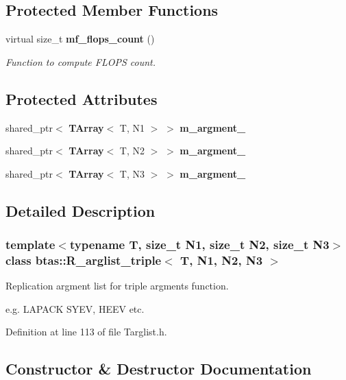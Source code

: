 \subsection*{Protected Member Functions}
\begin{DoxyCompactItemize}
\item 
virtual size\-\_\-t {\bf mf\-\_\-flops\-\_\-count} ()
\begin{DoxyCompactList}\small\item\em Function to compute F\-L\-O\-P\-S count. \end{DoxyCompactList}\end{DoxyCompactItemize}
\subsection*{Protected Attributes}
\begin{DoxyCompactItemize}
\item 
shared\-\_\-ptr$<$ {\bf T\-Array}$<$ T, N1 $>$ $>$ {\bf m\-\_\-argment\-\_}
\item 
shared\-\_\-ptr$<$ {\bf T\-Array}$<$ T, N2 $>$ $>$ {\bf m\-\_\-argment\-\_}
\item 
shared\-\_\-ptr$<$ {\bf T\-Array}$<$ T, N3 $>$ $>$ {\bf m\-\_\-argment\-\_}
\end{DoxyCompactItemize}


\subsection{Detailed Description}
\subsubsection*{template$<$typename T, size\-\_\-t N1, size\-\_\-t N2, size\-\_\-t N3$>$class btas\-::\-R\-\_\-arglist\-\_\-triple$<$ T, N1, N2, N3 $>$}

Replication argment list for triple argments function. 

e.\-g. L\-A\-P\-A\-C\-K S\-Y\-E\-V, H\-E\-E\-V etc. 

Definition at line 113 of file Targlist.\-h.



\subsection{Constructor \& Destructor Documentation}

